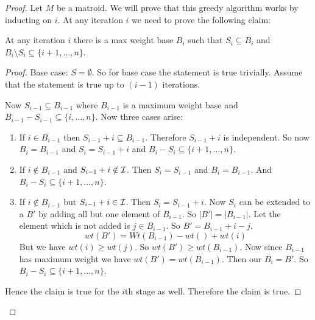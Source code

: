 \begin{algorithm}[H]
	\DontPrintSemicolon
	\caption{($E,W$)}
\end{algorithm}
\begin{proof}	Let $M$ be a matroid. We will prove that this greedy algorithm works by inducting on $i$. At any iteration $i$ we need to prove the following claim:
	
\begin{claimwidth}
			
	\begin{claim}{}{}
		At any iteration $i$ there is a max weight base $B_i$ such that $S_i\subseteq B_i$ and $B_i\setminus S_i\subseteq \{i+1,\dots, n\}$.
	\end{claim}
	
\begin{proof}
	Base case: $S=\emptyset$. So for base case the statement is true trivially. Assume that the statement is true up to $(i-1)$ iterations.\parinn
	
	Now $S_{i-1}\subseteq B_{i-1}$ where $B_{i-1}$ is a maximum weight base and $B_{i-1}-S_{i-1}\subseteq \{i,\dots, n\}$. Now three cases arise:
	\begin{enumerate}[label=\bfseries Case \arabic*:,leftmargin=1.5cm]
		\item If $i\in B_{i-1}$ then $S_{i-1}+i\subseteq B_{i-1}$. Therefore $S_{i-1}+i$ is independent. So now $B_i=B_{i-1}$ and $S_i=S_{i-1}+i$ and $B_i-S_i\subseteq \{i+1,\dots, n\}$.
		\item If $i\notin B_{i-1}$ and $S_{i-1}+i\notin \mathcal{I}$. Then $S_i=S_{i-1}$ and $B_i=B_{i-1}$. And $B_i-S_i\subseteq \{i+1,\dots , n\}$.
		\item If $i\notin B_{i-1}$ but $S_{i-1}+i\in \mathcal{I}$. Then $S_i=S_{i-1}+i$. Now $S_i$ can be extended to a $B'$ by adding all but one element of $B_{i-1}$. So $|B'|=|B_{i-1}|$. Let the element which is not added is $j\in B_{i-1}$. So $B'=B_{i-1}+i-j$. $$wt(B')=Wt(B_{i-1})-wt()+wt(i)$$But we have $wt(i)\geq wt(j)$. So $wt(B')\geq wt(B_{i-1})$. Now since $B_{i-1}$ has maximum weight we have $wt(B')=wt(B_{i-1})$. Then our $B_i=B'$. So $B_i-S_i\subseteq \{i+1,\dots, n\}$.
	\end{enumerate}
	Hence the claim is true for the $i$th stage as well. Therefore the claim is true.
\end{proof}
\end{claimwidth}


\end{proof}
